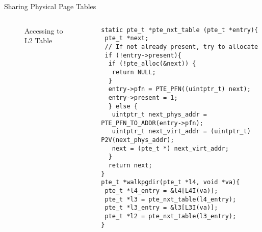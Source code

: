 \documentclass[aspectratio=169,xcolor=dvipsnames]{beamer}
\begin{document}
\begin{frame}[fragile]{Sharing Physical Page Tables}
\begin{columns}[c]
\begin{figure}
\begin{tikzpicture}[x=0.75pt,y=0.75pt,yscale=-0.5,xscale=0.5]
\end{tikzpicture}
        \caption{Accessing to L2 Table}
        \label{fig:enter-label}
    \end{figure}
\begin{lstlisting}[style=CStyleNum, basicstyle=\tiny]
static pte_t *pte_nxt_table (pte_t *entry){
 pte_t *next;
 // If not already present, try to allocate
 if (!entry->present){
  if (!pte_alloc(&next)) {
   return NULL;
  }
  entry->pfn = PTE_PFN((uintptr_t) next);
  entry->present = 1;
  } else {
   uintptr_t next_phys_addr = PTE_PFN_TO_ADDR(entry->pfn);        
   uintptr_t next_virt_addr = (uintptr_t) P2V(next_phys_addr);
   next = (pte_t *) next_virt_addr;
  }
  return next;
}   
pte_t *walkpgdir(pte_t *l4, void *va){ 
 pte_t *l4_entry = &l4[L4I(va)];
 pte_t *l3 = pte_nxt_table(l4_entry);
 pte_t *l3_entry = &l3[L3I(va)];
 pte_t *l2 = pte_nxt_table(l3_entry);
}

\end{lstlisting}
\end{columns}
\end{frame}
\end{document}
